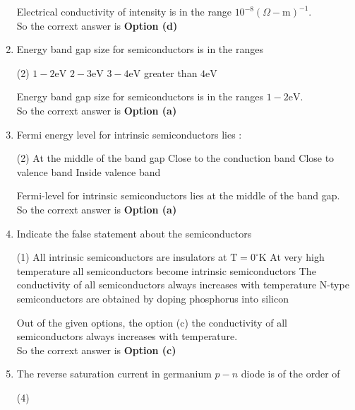 \begin{enumerate}
\begin{answer}
	Electrical conductivity of intensity is in the range $10^{-8}(\Omega-\mathrm{m})^{-1}$. \\
	So the corrext answer is \textbf{Option (d)}
	\end{answer}
	\item Energy band gap size for semiconductors is in the ranges
	 \begin{tasks}(2)
		\task[\textbf{a.}]$1-2 \mathrm{eV}$
		\task[\textbf{b.}]$2-3 \mathrm{eV}$
		\task[\textbf{c.}]$3-4 \mathrm{eV}$
		\task[\textbf{d.}]  greater than $4 \mathrm{eV}$
	\end{tasks}
	\begin{answer}
	Energy band gap size for semiconductors is in the ranges $1-2 \mathrm{eV}$. \\
	So the corrext answer is \textbf{Option (a)}
	\end{answer}
	\item Fermi energy level for intrinsic semiconductors lies :
	 \begin{tasks}(2)
		\task[\textbf{a.}]At the middle of the band gap
		\task[\textbf{b.}]Close to the conduction band
		\task[\textbf{c.}]Close to valence band
		\task[\textbf{d.}] Inside valence band
	\end{tasks}
	\begin{answer}
		Fermi-level for intrinsic semiconductors lies at the middle of the band gap. \\
		So the corrext answer is \textbf{Option (a)}
	\end{answer}
	\item Indicate the false statement about the semiconductors
	 \begin{tasks}(1)
		\task[\textbf{a.}]All intrinsic semiconductors are insulators at $\mathrm{T}=0^{\circ} \mathrm{K}$
		\task[\textbf{b.}]At very high temperature all semiconductors become intrinsic semiconductors
		\task[\textbf{c.}] The conductivity of all semiconductors always increases with temperature
		\task[\textbf{d.}] N-type semiconductors are obtained by doping phosphorus into silicon
	\end{tasks}
	\begin{answer}
			Out of the given options, the option (c) the conductivity of all semiconductors always increases with temperature.\\
		So the corrext answer is \textbf{Option (c)}
	\end{answer}
\item The reverse saturation current in germanium $p-n$ diode is of the order of
	 \begin{tasks}(4)

\end{tasks}
\end{enumerate}
